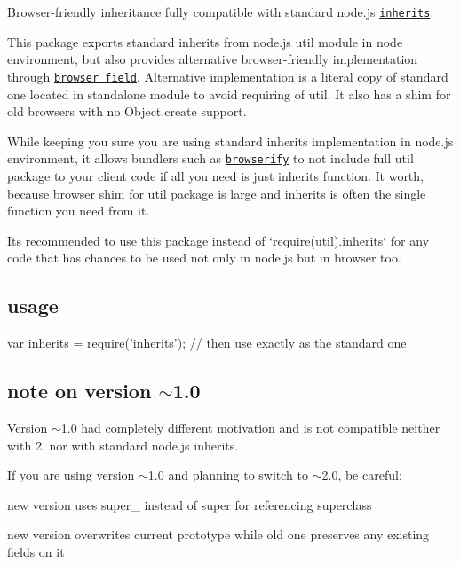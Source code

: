 Browser-\/friendly inheritance fully compatible with standard node.\+js \href{http://nodejs.org/api/util.html#util_util_inherits_constructor_superconstructor}{\tt inherits}.

This package exports standard {\ttfamily inherits} from node.\+js {\ttfamily util} module in node environment, but also provides alternative browser-\/friendly implementation through \href{https://gist.github.com/shtylman/4339901}{\tt browser field}. Alternative implementation is a literal copy of standard one located in standalone module to avoid requiring of {\ttfamily util}. It also has a shim for old browsers with no {\ttfamily Object.\+create} support.

While keeping you sure you are using standard {\ttfamily inherits} implementation in node.\+js environment, it allows bundlers such as \href{https://github.com/substack/node-browserify}{\tt browserify} to not include full {\ttfamily util} package to your client code if all you need is just {\ttfamily inherits} function. It worth, because browser shim for {\ttfamily util} package is large and {\ttfamily inherits} is often the single function you need from it.

It\textquotesingle{}s recommended to use this package instead of `require(\textquotesingle{}util\textquotesingle{}).inherits` for any code that has chances to be used not only in node.\+js but in browser too.

\subsection*{usage}


\begin{DoxyCode}
\hyperlink{018__def_8c_a335628f2e9085305224b4f9cc6e95ed5}{var} inherits = require(\textcolor{stringliteral}{'inherits'});
\textcolor{comment}{// then use exactly as the standard one}
\end{DoxyCode}


\subsection*{note on version $\sim$1.0}

Version $\sim$1.0 had completely different motivation and is not compatible neither with 2. nor with standard node.\+js {\ttfamily inherits}.

If you are using version $\sim$1.0 and planning to switch to $\sim$2.0, be careful\+:


\begin{DoxyItemize}
\item new version uses {\ttfamily super\+\_\+} instead of {\ttfamily super} for referencing superclass
\item new version overwrites current prototype while old one preserves any existing fields on it 
\end{DoxyItemize}